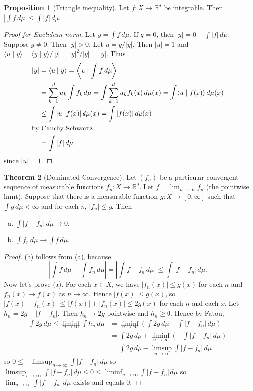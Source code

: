 \documentclass{article}
\newcommand{\R}{\mathbb{R}}
\theoremstyle{definition}
\newtheorem{theorem}{Theorem}
\newtheorem{proposition}[theorem]{Proposition}
\begin{document}
\begin{proposition}[Triangle inequality]
Let $f : X \longrightarrow \R^d$ be integrable. Then $|\int f\,d\mu| \leq \int |f|\,d\mu$.
\end{proposition}
\begin{proof}[Proof for Euclidean norm]
    Let $y = \int f\,d\mu$. If $y = 0$, then $|y| = 0 - \int |f|\,d\mu$. Suppose $y \neq 0$. Then $|y| > 0$. Let $u = y/|y|$. Then $|u| = 1$ and $\langle u \mid y \rangle = \langle y \mid y \rangle / |y| = |y|^2/|y| = |y|$.
    Thus
    \begin{align*}
        |y| &= \langle u \mid y \rangle = \left\langle u \mid \int f\,d\mu \right\rangle \\
            &= \sum_{k=1}^d u_k \int f_k\,d\mu = \int \sum_{k=1}^d u_k f_k(x) \,d\mu(x)
            = \int \langle u \mid f(x) \rangle \,d\mu(x) \\
            &\leq \int |u||f(x)| \,d\mu(x) = \int |f(x)| \,d\mu(x) \\
            \intertext{by Cauchy-Schwartz}
            &= \int |f|\,d\mu
    \end{align*}
    since $|u| = 1$.
\end{proof}

\begin{theorem}[Dominated Convergence]
Let $(f_n)$ be a particular convergent sequence of measurable functions $f_n : X \longrightarrow \R^d$. Let $f = \lim_{n\to\infty} f_n$ (the pointwise limit). Suppose that there is a measurable function $g : X \longrightarrow [0, \infty]$ such that $\int g \,d\mu < \infty$ and for each $n$, $|f_n| \leq g$. Then
\begin{enumerate}[(a)]
    \item $\int |f - f_n| \,d\mu \to 0$.
    \item $\int f_n\,d\mu \to \int f\,d\mu$.
\end{enumerate}
\end{theorem}
\begin{proof}
    (b) follows from (a), because
    \[
        \left| \int f\,d\mu - \int f_n\,d\mu \right| = \left| \int f - f_n\,d\mu \right| \leq \int |f-f_n|\,d\mu.
    \]
    Now let's prove (a). For each $x \in X$, we have $|f_n(x)| \leq g(x)$ for each $n$ and $f_n(x) \to f(x)$ as $n \to \infty$. Hence $|f(x)| \leq g(x)$, so $|f(x) - f_n(x)| \leq |f(x)| + |f_n(x)| \leq 2g(x)$ for each $n$ and each $x$.
    Let $h_n = 2g - |f - f_n|$. Then $h_n \to 2g$ pointwise and $h_n \geq 0$. Hence by Fatou,
    \begin{align*}
        \int 2g \,d\mu \leq \liminf_{n\to\infty} \int h_n\,d\mu
        &= \liminf_{n\to\infty} \left( \int 2g\,d\mu - \int |f-f_n|\,d\mu \right) \\
        &= \int 2g\,d\mu + \liminf_{n\to\infty} \left( -\int |f-f_n|\,d\mu \right) \\
        &= \int 2g\,d\mu - \limsup_{n\to\infty} \int |f-f_n|\,d\mu
    \end{align*}
    so $0 \leq -\limsup_{n\to\infty} \int |f-f_n|\,d\mu$
    so $\limsup_{n\to\infty} \int |f-f_n|\,d\mu \leq 0 \leq \liminf_{n\to\infty} \int |f-f_n|\,d\mu$
    so $\lim_{n\to\infty} \int |f-f_n|\,d\mu$ exists and equals $0$.
\end{proof}
\end{document}
